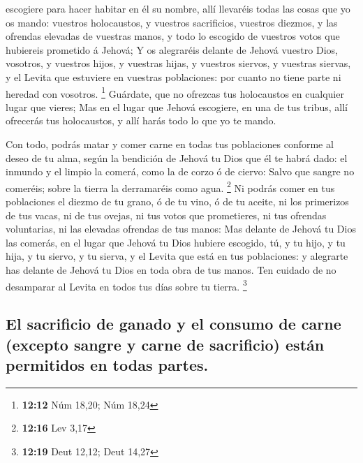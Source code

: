 escogiere para hacer habitar en él su nombre, allí llevaréis todas las
cosas que yo os mando: vuestros holocaustos, y vuestros sacrificios,
vuestros diezmos, y las ofrendas elevadas de vuestras manos, y todo lo
escogido de vuestros votos que hubiereis prometido á Jehová;
 Y os alegraréis delante de Jehová vuestro Dios,
vosotros, y vuestros hijos, y vuestras hijas, y vuestros siervos, y
vuestras siervas, y el Levita que estuviere en vuestras poblaciones: por
cuanto no tiene parte ni heredad con vosotros. \footnote{\textbf{12:12}
  Núm 18,20; Núm 18,24}  Guárdate, que no ofrezcas tus
holocaustos en cualquier lugar que vieres;  Mas en el
lugar que Jehová escogiere, en una de tus tribus, allí ofrecerás tus
holocaustos, y allí harás todo lo que yo te mando.

 Con todo, podrás matar y comer carne en todas tus
poblaciones conforme al deseo de tu alma, según la bendición de Jehová
tu Dios que él te habrá dado: el inmundo y el limpio la comerá, como la
de corzo ó de ciervo:  Salvo que sangre no comeréis;
sobre la tierra la derramaréis como agua. \footnote{\textbf{12:16} Lev
  3,17}  Ni podrás comer en tus poblaciones el diezmo de
tu grano, ó de tu vino, ó de tu aceite, ni los primerizos de tus vacas,
ni de tus ovejas, ni tus votos que prometieres, ni tus ofrendas
voluntarias, ni las elevadas ofrendas de tus manos:  Mas
delante de Jehová tu Dios las comerás, en el lugar que Jehová tu Dios
hubiere escogido, tú, y tu hijo, y tu hija, y tu siervo, y tu sierva, y
el Levita que está en tus poblaciones: y alegrarte has delante de Jehová
tu Dios en toda obra de tus manos.  Ten cuidado de no
desamparar al Levita en todos tus días sobre tu tierra. \footnote{\textbf{12:19}
  Deut 12,12; Deut 14,27}

\hypertarget{el-sacrificio-de-ganado-y-el-consumo-de-carne-excepto-sangre-y-carne-de-sacrificio-estuxe1n-permitidos-en-todas-partes.}{%
\subsection{El sacrificio de ganado y el consumo de carne (excepto
sangre y carne de sacrificio) están permitidos en todas
partes.}\label{el-sacrificio-de-ganado-y-el-consumo-de-carne-excepto-sangre-y-carne-de-sacrificio-estuxe1n-permitidos-en-todas-partes.}}

